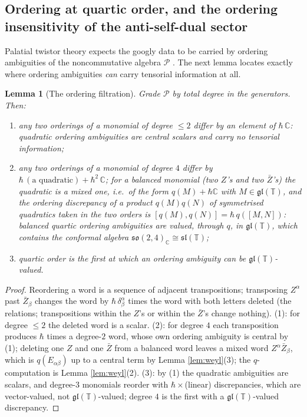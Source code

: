 \documentclass[11pt]{article}
\newtheorem{lemma}[theorem]{Lemma}
\theoremstyle{definition}
\newcommand{\C}{\mathbb{C}}
\newcommand{\T}{\mathbb{T}}
\begin{document}
\subsection{Ordering at quartic order, and the ordering insensitivity of the anti-self-dual sector}\label{subsec:quartic}

Palatial twistor theory expects the googly data to be carried by ordering ambiguities of the noncommutative algebra $\mathcal{P}$ \cite{Penrose15}. The next lemma locates exactly where ordering ambiguities \emph{can} carry tensorial information at all.

\begin{lemma}[The ordering filtration]\label{lem:quartic}
Grade $\mathcal{P}$ by total degree in the generators. Then:
\begin{enumerate}
\item any two orderings of a monomial of degree $\le 2$ differ by an element of $\hbar\,\C$: quadratic ordering ambiguities are central scalars and carry no tensorial information;
\item any two orderings of a monomial of degree $4$ differ by $\hbar\,(\text{a quadratic}) + \hbar^2\,\C$; for a \emph{balanced} monomial (two $Z$'s and two $\bar Z$'s) the quadratic is a mixed one, i.e.\ of the form $q(M) + \hbar\C$ with $M \in \mathfrak{gl}(\T)$, and the ordering discrepancy of a product $q(M)q(N)$ of symmetrised quadratics taken in the two orders is $[q(M), q(N)] = \hbar\,q([M,N])$: balanced quartic ordering ambiguities are valued, through $q$, in $\mathfrak{gl}(\T)$, which contains the conformal algebra $\mathfrak{so}(2,4)_\C \cong \mathfrak{sl}(\T)$;
\item quartic order is the \emph{first} at which an ordering ambiguity can be $\mathfrak{gl}(\T)$-valued.
\end{enumerate}
\end{lemma}

\begin{proof}
Reordering a word is a sequence of adjacent transpositions; transposing $Z^\alpha$ past $\bar Z_\beta$ changes the word by $\hbar\,\delta^\alpha_\beta$ times the word with both letters deleted (the relations; transpositions within the $Z$'s or within the $\bar Z$'s change nothing). (1): for degree $\le 2$ the deleted word is a scalar. (2): for degree $4$ each transposition produces $\hbar$ times a degree-$2$ word, whose own ordering ambiguity is central by (1); deleting one $Z$ and one $\bar Z$ from a balanced word leaves a mixed word $Z^\alpha\bar Z_\beta$, which is $q(E_{\alpha\beta})$ up to a central term by Lemma \ref{lem:weyl}(3); the $q$-computation is Lemma \ref{lem:weyl}(2). (3): by (1) the quadratic ambiguities are scalars, and degree-$3$ monomials reorder with $\hbar\times$(linear) discrepancies, which are vector-valued, not $\mathfrak{gl}(\T)$-valued; degree $4$ is the first with a $\mathfrak{gl}(\T)$-valued discrepancy.
\end{proof}
\end{document}
